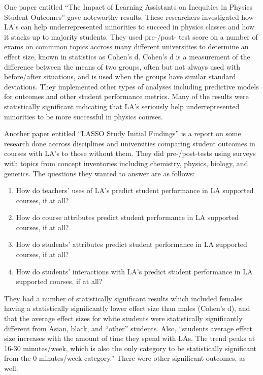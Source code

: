 \documentclass[]{article}
\providecommand{\tightlist}{%
  \setlength{\itemsep}{0pt}\setlength{\parskip}{0pt}}
\begin{document}
One paper entitled ``The Impact of Learning Assistants on Inequities in
Physics Student Outcomes'' gave noteworthy results. These researchers
investigated how LA's can help underrepresented minorities to succeed in
physics classes and how it stacks up to majority students. They used
pre-/post- test score on a number of exams on commmon topics accross
many different universities to determine an effect size, known in
statistics as Cohen's d. Cohen's d is a measurement of the difference
between the means of two groups, often but not always used with
before/after situations, and is used when the groups have similar
standard deviations. They implemented other types of analyses including
predictive models for outcomes and other student performance metrics.
Many of the results were statistically significant indicating that LA's
seriously help underrepresented minorities to be more successful in
physics courses. \cite{VanDusen1}

Another paper entitled ``LASSO Study Initial Findings'' is a report on
some research done accross disciplines and universities comparing
student outcomes in courses with LA's to those without them. They did
pre-/post-tests using surveys with topics from concept inventories
including chemistry, physics, biology, and genetics. The questions they
wanted to answer are as follows:

\begin{enumerate}
\def\labelenumi{\arabic{enumi}.}
\tightlist
\item
  How do teachers' uses of LA's predict student performance in LA
  supported courses, if at all?
\item
  How do course attributes predict student performance in LA supported
  courses, if at all?
\item
  How do students' attributes predict student performance in LA
  supported courses, if at all?
\item
  How do students' interactions with LA's predict student performance in
  LA supported courses, if at all?
\end{enumerate}

They had a number of statistically significant results which included
females having a statistically significantly lower effect size than
males (Cohen's d), and that the average effect sizes for white students
were statistically significantly different from Asian, black, and
``other'' students. Also, ``students average effect size increases with
the amount of time they spend with LAs. The trend peaks at 16-30
minutes/week, which is also the only category to be statistically
significant from the 0 minutes/week category.'' There were other
significant outcomes, as well. \cite{VanDusen2}
\end{document}
